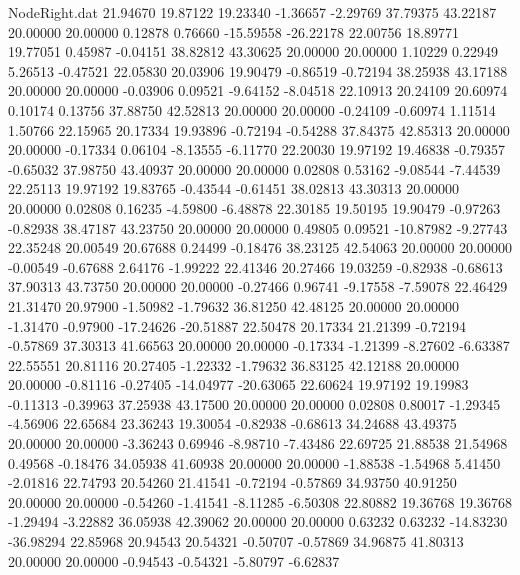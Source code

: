 \begin{filecontents}{NodeRight.dat}
  21.94670   19.87122   19.23340    -1.36657   -2.29769   37.79375   43.22187   20.00000   20.00000    0.12878    0.76660  -15.59558  -26.22178
  22.00756   18.89771   19.77051     0.45987   -0.04151   38.82812   43.30625   20.00000   20.00000    1.10229    0.22949    5.26513   -0.47521
  22.05830   20.03906   19.90479    -0.86519   -0.72194   38.25938   43.17188   20.00000   20.00000   -0.03906    0.09521   -9.64152   -8.04518
  22.10913   20.24109   20.60974     0.10174    0.13756   37.88750   42.52813   20.00000   20.00000   -0.24109   -0.60974    1.11514    1.50766
  22.15965   20.17334   19.93896    -0.72194   -0.54288   37.84375   42.85313   20.00000   20.00000   -0.17334    0.06104   -8.13555   -6.11770
  22.20030   19.97192   19.46838    -0.79357   -0.65032   37.98750   43.40937   20.00000   20.00000    0.02808    0.53162   -9.08544   -7.44539
  22.25113   19.97192   19.83765    -0.43544   -0.61451   38.02813   43.30313   20.00000   20.00000    0.02808    0.16235   -4.59800   -6.48878
  22.30185   19.50195   19.90479    -0.97263   -0.82938   38.47187   43.23750   20.00000   20.00000    0.49805    0.09521  -10.87982   -9.27743
  22.35248   20.00549   20.67688     0.24499   -0.18476   38.23125   42.54063   20.00000   20.00000   -0.00549   -0.67688    2.64176   -1.99222
  22.41346   20.27466   19.03259    -0.82938   -0.68613   37.90313   43.73750   20.00000   20.00000   -0.27466    0.96741   -9.17558   -7.59078
  22.46429   21.31470   20.97900    -1.50982   -1.79632   36.81250   42.48125   20.00000   20.00000   -1.31470   -0.97900  -17.24626  -20.51887
  22.50478   20.17334   21.21399    -0.72194   -0.57869   37.30313   41.66563   20.00000   20.00000   -0.17334   -1.21399   -8.27602   -6.63387
  22.55551   20.81116   20.27405    -1.22332   -1.79632   36.83125   42.12188   20.00000   20.00000   -0.81116   -0.27405  -14.04977  -20.63065
  22.60624   19.97192   19.19983    -0.11313   -0.39963   37.25938   43.17500   20.00000   20.00000    0.02808    0.80017   -1.29345   -4.56906
  22.65684   23.36243   19.30054    -0.82938   -0.68613   34.24688   43.49375   20.00000   20.00000   -3.36243    0.69946   -8.98710   -7.43486
  22.69725   21.88538   21.54968     0.49568   -0.18476   34.05938   41.60938   20.00000   20.00000   -1.88538   -1.54968    5.41450   -2.01816
  22.74793   20.54260   21.41541    -0.72194   -0.57869   34.93750   40.91250   20.00000   20.00000   -0.54260   -1.41541   -8.11285   -6.50308
  22.80882   19.36768   19.36768    -1.29494   -3.22882   36.05938   42.39062   20.00000   20.00000    0.63232    0.63232  -14.83230  -36.98294
  22.85968   20.94543   20.54321    -0.50707   -0.57869   34.96875   41.80313   20.00000   20.00000   -0.94543   -0.54321   -5.80797   -6.62837

\end{filecontents}

